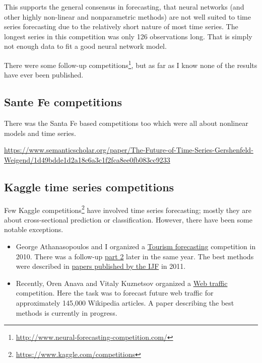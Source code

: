 \documentclass[11pt,a4paper,]{article}
\begin{document}
This supports the general consensus in forecasting, that neural networks (and other highly non-linear and nonparametric methods) are not well suited to time series forecasting due to the relatively short nature of most time series. The longest series in this competition was only 126 observations long. That is simply not enough data to fit a good neural network model.

There were some follow-up competitions\footnote{\url{http://www.neural-forecasting-competition.com/}}, but as far as I know none of the results have ever been published.

\hypertarget{sante-fe-competitions}{%
\subsection{Sante Fe competitions}\label{sante-fe-competitions}}

There was the Santa Fe based competitions too which were all about nonlinear models and time series.

\url{https://www.semanticscholar.org/paper/The-Future-of-Time-Series-Gershenfeld-Weigend/1d49bdde1d2a18c6a3c1f2fca8ee0fb083cc9233}

\hypertarget{kaggle-time-series-competitions}{%
\subsection*{Kaggle time series competitions}\label{kaggle-time-series-competitions}}

Few Kaggle competitions\footnote{\url{https://www.kaggle.com/competitions}} have involved time series forecasting; mostly they are about cross-sectional prediction or classification. However, there have been some notable exceptions.

\begin{itemize}
\item
  George Athanasopoulos and I organized a \href{https://www.kaggle.com/c/tourism1}{Tourism forecasting} competition in 2010. There was a follow-up \href{https://www.kaggle.com/c/tourism2}{part 2} later in the same year. The best methods were described in \href{https://www.sciencedirect.com/journal/international-journal-of-forecasting/vol/27/issue/3}{papers published by the IJF} in 2011.
\item
  Recently, Oren Anava and Vitaly Kuznetsov organized a \href{https://www.kaggle.com/c/web-traffic-time-series-forecasting}{Web traffic} competition. Here the task was to forecast future web traffic for approximately 145,000 Wikipedia articles. A paper describing the best methods is currently in progress.
\end{itemize}
\end{document}
